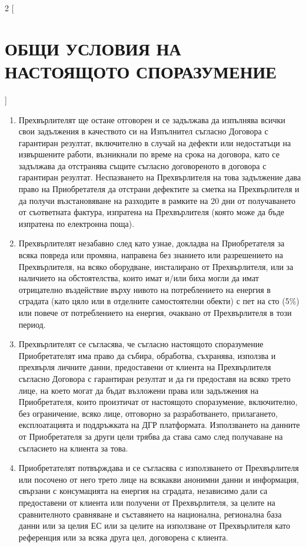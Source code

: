 \begin{multicols}{2} [\section{ОБЩИ УСЛОВИЯ НА НАСТОЯЩОТО
    СПОРАЗУМЕНИЕ}]
\begin{enumerate}
    Европа (ICPEU {-}
    http://europe.eeperformance.org/). Прехвърлителят стриктно спазва
    и е обвързан с разпоредбите на Европейски професионален кодекс за
    договорите с гарантиран резултат ([●]) и гарантира неговото
    надлежно изпълнение.
  \item Прехвърлителят ще остане отговорен и се задължава да изпълнява
    всички свои задължения в качеството си на Изпълнител съгласно
    Договора с гарантиран резултат, включително в случай на дефекти
    или недостатъци на извършените работи, възникнали по време на
    срока на договора, като се задължава да отстранява същите съгласно
    договореното в договора с гарантиран резултат. Неспазването на
    Прехвърлителя на това задължение дава право на Приобретателя да
    отстрани дефектите за сметка на Прехвърлителя и да получи
    възстановяване на разходите в рамките на 20 дни от получаването от
    съответната фактура, изпратена на Прехвърлителя (която може да
    бъде изпратена по електронна поща).
  \item Прехвърлителят незабавно след като узнае, докладва на
    Приобретателя за всяка повреда или промяна, направена без знанието
    или разрешението на Прехвърлителя, на всяко оборудване,
    инсталирано от Прехвърлителя, или за наличието на обстоятелства,
    които имат и/или биха могли да имат отрицателно въздействие върху
    нивото на потреблението на енергия в сградата (като цяло или в
    отделните самостоятелни обекти) с пет на сто (5\%) или повече от
    потреблението на енергия, очаквано от Прехвърлителя в този период.
  \item Прехвърлителят се съгласява, че съгласно настоящото
    споразумение Приобретателят има право да събира, обработва,
    съхранява, използва и прехвърля личните данни, предоставени от
    клиента на Прехвърлителя съгласно Договора с гарантиран резултат и
    да ги предоставя на всяко трето лице, на което могат да бъдат
    възложени права или задължения на Приобретателя, които произтичат
    от настоящото споразумение, включително, без ограничение, всяко
    лице, отговорно за разработването, прилагането, експлоатацията и
    поддръжката на ДГР платформата. Използването на данните от
    Приобретателя за други цели трябва да става само след получаване
    на съгласието на клиента за това.
  \item Приобретателят потвърждава и се съгласява с използването от
    Прехвърлителя или посочено от него трето лице на всякакви анонимни
    данни и информация, свързани с консумацията на енергия на
    сградата, независимо дали са предоставени от клиента или получени
    от Прехвърлителя, за целите на сравнителното сравняване и
    съставянето на национална, регионална база данни или за целия ЕС
    или за целите на използване от Прехвърлителя като референция или
    за всяка друга цел, договорена с клиента.
  \end{enumerate}


\end{multicols}
